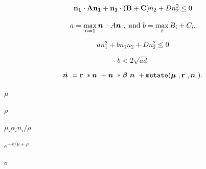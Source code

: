 {\newpage\clearpage
{}%
\begin{displaymath}
{\bf n_1}\cdot{\bf A}{\bf n_1} + {\bf n_1}\cdot({\bf B}+{\bf C})n_2 +
Dn_2^2 \leq 0
\end{displaymath}%
\lthtmldisplayZ
\hfill\lthtmlcheckvsize\clearpage}

{\newpage\clearpage
{}%
\begin{displaymath}a=\max_{n=1} \mbox{\boldmath {$n$ }}\cdot A\mbox{\boldmath {$n$ }},\mbox{ and } b=\max_{i}B_i+C_i.
\end{displaymath}%
\lthtmldisplayZ
\hfill\lthtmlcheckvsize\clearpage}

{\newpage\clearpage
{}%
\begin{displaymath}an_1^2+bn_1n_2+Dn_2^2\leq0
\end{displaymath}%
\lthtmldisplayZ
\hfill\lthtmlcheckvsize\clearpage}

{\newpage\clearpage
{}%
\begin{displaymath}
b < 2\sqrt{ad}
\end{displaymath}%
\lthtmldisplayZ
\hfill\lthtmlcheckvsize\clearpage}

{\newpage\clearpage
{}%
\begin{displaymath}\dot{\mbox{\boldmath {$n$ }}} = \mbox{${\bf r}$ }*\mbox{\boldmath {$n$ }}+ \mbox{\boldmath {$n$ }}*\mbox{\boldmath {$\beta$ }}\mbox{\boldmath {$n$ }}+ {\tt mutate}(\mbox{\boldmath {$\mu$ }},\mbox{${\bf r}$ },\mbox{\boldmath {$n$ }}).
\end{displaymath}%
\lthtmldisplayZ
\hfill\lthtmlcheckvsize\clearpage}

{\newpage\clearpage
{}%
$\mu$%
\lthtmlinlinemathZ
\hfill\lthtmlcheckvsize\clearpage}

{\newpage\clearpage
{}%
$\rho$%
\lthtmlinlinemathZ
\hfill\lthtmlcheckvsize\clearpage}

{\newpage\clearpage
{}%
$\mu_i\alpha_in_i/\rho$%
\lthtmlinlinemathZ
\hfill\lthtmlcheckvsize\clearpage}

{\newpage\clearpage
{}%
$e^{-x/\mu+\rho}$%
\lthtmlinlinemathZ
\hfill\lthtmlcheckvsize\clearpage}

{\newpage\clearpage
{}%
$\sigma$%
\lthtmlinlinemathZ
\hfill\lthtmlcheckvsize\clearpage}


